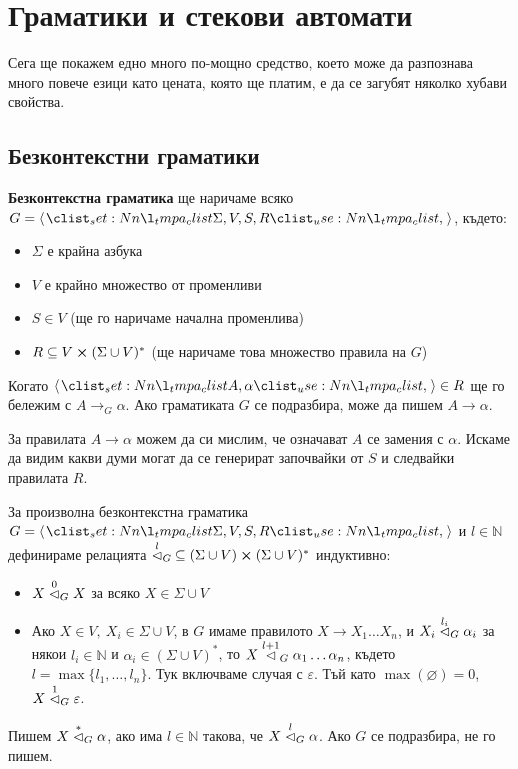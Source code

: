 \chapter{Граматики и стекови автомати}

Сега ще покажем едно много по-мощно средство,
което може да разпознава много повече езици като цената, която ще платим,
е да се загубят няколко хубави свойства.

\section{Безконтекстни граматики}

\begin{definition}
    \textbf{Безконтекстна граматика} ще наричаме всяко $G = \opair{\Sigma, V, S, R}$, където:
    \begin{itemize}
        \item $\Sigma$ е крайна азбука
        \item $V$ е крайно множество от променливи
        \item $S \in V$ (ще го наричаме начална променлива)
        \item $R \subseteq V \cross (\Sigma \cup V)^*$ (ще наричаме това множество правила на $G$)
    \end{itemize}
\end{definition}

\begin{remark}
    Когато $\opair{A, \alpha} \in R$ ще го бележим с $A \rightarrow_G \alpha$.
    Ако граматиката $G$ се подразбира, може да пишем $A \rightarrow \alpha$.
\end{remark}

За правилата $A \rightarrow \alpha$ можем да си мислим, че означават $A$ се замения с $\alpha$.
Искаме да видим какви думи могат да се генерират започвайки от $S$ и следвайки правилата $R$.

\begin{definition}
    За произволна безконтекстна граматика $G = \opair{\Sigma, V, S, R}$ и $l \in \mathbb{N}$ дефинираме релацията $\stackrel{l}{\vartriangleleft}_G \: \subseteq (\Sigma \cup V) \cross (\Sigma \cup V)^*$ индуктивно:
    \begin{itemize}
        \item $X \stackrel{0}{\vartriangleleft}_G X$ за всяко $X \in \Sigma \cup V$
        \item Ако $X \in V, \: X_i \in \Sigma \cup V$, в $G$ имаме правилото $X \rightarrow X_1 \dots X_n$, и $X_i \stackrel{l_i}{\vartriangleleft}_G \alpha_i$ за някои $l_i \in \mathbb{N}$ и $\alpha_i \in (\Sigma \cup V)^*$,
              то $X \stackrel{l + 1}{\vartriangleleft}_G \alpha_1 \dots \alpha_n$, където $l = \max \{ l_1, \dots, l_n \}$. Тук включваме случая с $\varepsilon$.
              Тъй като $\max(\varnothing) = 0$, $X \stackrel{1}{\vartriangleleft}_G \varepsilon$.
    \end{itemize}
    Пишем $X \stackrel{*}{\vartriangleleft}_G \alpha$, ако има $l \in \mathbb{N}$ такова, че $X \stackrel{l}{\vartriangleleft}_G \alpha$.
    Ако $G$ се подразбира, не го пишем.
\end{definition}

